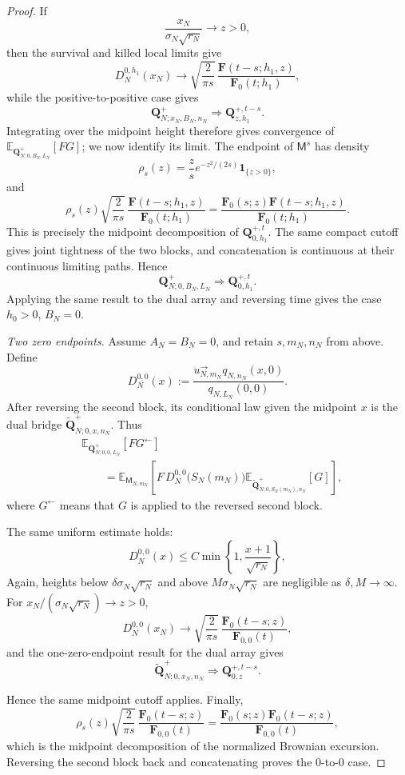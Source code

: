 \documentclass[11pt]{article}
\theoremstyle{plain}
\theoremstyle{definition}
\theoremstyle{remark}
\newcommand{\Ee}{\mathbb E}
\begin{document}
\begin{proof}
If
\[
 \frac{x_N}{\sigma_N\sqrt{r_N}}\longrightarrow z>0,
\]
then the survival and killed local limits give
\[
 D_N^{0,h_1}(x_N)
 \longrightarrow
 \sqrt{\frac{2}{\pi s}}\,
 \frac{\mathbf F(t-s;h_1,z)}
      {\mathbf F_0(t;h_1)},
\]
while the positive-to-positive case gives
\[
 \mathbf Q_{N;x_N,B_N,n_N}^{+}
 \Longrightarrow
 \mathbf Q_{z,h_1}^{+,t-s}.
\]
Integrating over the midpoint height therefore gives convergence of
\(\Ee_{\mathbf Q_{N;0,B_N,L_N}^{+}}[FG]\); we now identify its limit.
The endpoint of \(\mathsf M^s\) has density
\[
 \rho_s(z)=\frac{z}{s}e^{-z^2/(2s)}\mathbf1_{\{z>0\}},
\]
and
\[
 \rho_s(z)
 \sqrt{\frac{2}{\pi s}}\,
 \frac{\mathbf F(t-s;h_1,z)}
      {\mathbf F_0(t;h_1)}
 =
 \frac{
   \mathbf F_0(s;z)\mathbf F(t-s;h_1,z)
 }{
   \mathbf F_0(t;h_1)
 }.
\]
This is precisely the midpoint decomposition of
\(\mathbf Q_{0,h_1}^{+,t}\).  The same compact cutoff gives joint
tightness of the two blocks, and concatenation is continuous at their
continuous limiting paths.  Hence
\[
 \mathbf Q_{N;0,B_N,L_N}^{+}
 \Longrightarrow
 \mathbf Q_{0,h_1}^{+,t}.
\]
Applying the same result to the dual array and reversing time gives the
case \(h_0>0\), \(B_N=0\).

\smallskip
\noindent
\emph{Two zero endpoints.}
Assume \(A_N=B_N=0\), and retain \(s,m_N,n_N\) from above.  Define
\[
 D_N^{0,0}(x)
 :=
 \frac{
   u_{N,m_N}^{\rightarrow}q_{N,n_N}(x,0)
 }{
   q_{N,L_N}(0,0)
 }.
\]
After reversing the second block, its conditional law given the
midpoint \(x\) is the dual bridge
\(\widetilde{\mathbf Q}_{N;0,x,n_N}^{+}\).  Thus
\[
\begin{aligned}
 &\Ee_{\mathbf Q_{N;0,0,L_N}^{+}}[F G^{\leftarrow}]\\
 &\qquad =
 \Ee_{\mathsf M_{N,m_N}}
 \left[
   F\,D_N^{0,0}\bigl(S_N(m_N)\bigr)
   \Ee_{\widetilde{\mathbf Q}_{N;0,S_N(m_N),n_N}^{+}}[G]
 \right],
\end{aligned}
\]
where \(G^{\leftarrow}\) means that \(G\) is applied to the reversed
second block.

The same uniform estimate holds:
\[
 D_N^{0,0}(x)
 \le
 C\min\left\{1,\frac{x+1}{\sqrt{r_N}}\right\},
\]
Again, heights below \(\delta\sigma_N\sqrt{r_N}\) and above
\(M\sigma_N\sqrt{r_N}\) are negligible as \(\delta, M\to\infty\).
For \(x_N/(\sigma_N\sqrt{r_N})\to z>0\),
\[
 D_N^{0,0}(x_N)
 \longrightarrow
 \sqrt{\frac{2}{\pi s}}\,
 \frac{\mathbf F_0(t-s;z)}
      {\mathbf F_{0,0}(t)},
\]
and the one-zero-endpoint result for the dual array gives
\[
 \widetilde{\mathbf Q}_{N;0,x_N,n_N}^{+}
 \Longrightarrow
 \mathbf Q_{0,z}^{+,t-s}.
\]

Hence the same midpoint cutoff applies.  Finally,
\[
 \rho_s(z)
 \sqrt{\frac{2}{\pi s}}\,
 \frac{\mathbf F_0(t-s;z)}
      {\mathbf F_{0,0}(t)}
 =
 \frac{
   \mathbf F_0(s;z)\mathbf F_0(t-s;z)
 }{
   \mathbf F_{0,0}(t)
 },
\]
which is the midpoint decomposition of the normalized Brownian
excursion.  Reversing the second block back and concatenating proves
the \(0\)-to-\(0\) case.




\end{proof}
\end{document}
